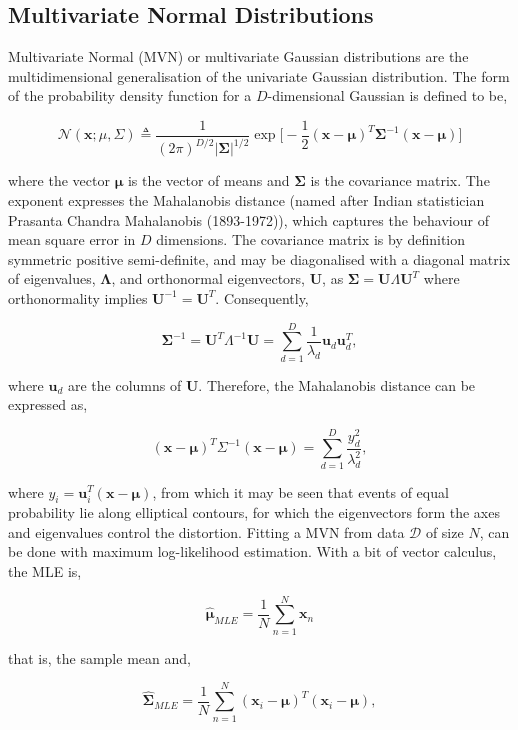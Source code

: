 \documentclass[11pt]{amsart}
\begin{document}
\subsection{Multivariate Normal Distributions}
Multivariate Normal (MVN) or multivariate Gaussian distributions are the multidimensional generalisation of the univariate Gaussian distribution. The form of the probability density function for a $D$-dimensional Gaussian is defined to be,

$$\mathcal{N}(\mathbf{x} ; \mu, \Sigma) \triangleq \frac{1}{(2\pi)^{D/2}|\boldsymbol\Sigma|^{1/2}}
\exp\bigg[-\frac{1}{2}(\mathbf{x} - \boldsymbol\mu)^T\boldsymbol\Sigma^{-1}(\mathbf{x} - \boldsymbol\mu)\bigg]
$$

where the vector $\boldsymbol\mu$ is the vector of means and $\boldsymbol\Sigma$ is the covariance matrix. The exponent expresses the Mahalanobis distance (named after Indian statistician Prasanta Chandra Mahalanobis (1893-1972)), which captures the behaviour of mean square error in $D$ dimensions. The covariance matrix is by definition symmetric positive semi-definite, and may be diagonalised with a diagonal matrix of eigenvalues, $\boldsymbol\Lambda$, and orthonormal eigenvectors, $\mathbf{U}$, as $\boldsymbol\Sigma = \mathbf{U}\Lambda\mathbf{U}^T$ where orthonormality implies $\mathbf{U}^{-1} = \mathbf{U}^T$. Consequently,

$$\boldsymbol\Sigma^{-1} = \mathbf{U}^T\Lambda^{-1}\mathbf{U} = \sum_{d=1}^D\frac{1}{\lambda_d}\mathbf{u}_d\mathbf{u}_d^T,$$

where $\mathbf{u}_d$ are the columns of $\mathbf{U}$. Therefore, the Mahalanobis distance can be expressed as,

$$(\mathbf{x} - \boldsymbol\mu)^T\Sigma^{-1}(\mathbf{x} - \boldsymbol\mu) = \sum_{d=1}^D\frac{y_d^2}{\lambda_d^2},$$

where $y_i = \mathbf{u}_i^T(\mathbf{x} - \boldsymbol\mu)$, from which it may be seen that events of equal probability lie along elliptical contours, for which the eigenvectors form the axes and eigenvalues control the distortion. Fitting a MVN from data $\mathcal{D}$ of size $N$, can be done with maximum log-likelihood estimation. With a bit of vector calculus, the MLE is,

$$\hat{\boldsymbol\mu}_{MLE} = \frac{1}{N}\sum_{n=1}^N\mathbf{x}_n$$

that is, the sample mean and,

$$\hat{\boldsymbol\Sigma}_{MLE} = \frac{1}{N}\sum_{n=1}^N(\mathbf{x}_i - \boldsymbol\mu)^T(\mathbf{x}_i - \boldsymbol\mu),$$
\end{document}
